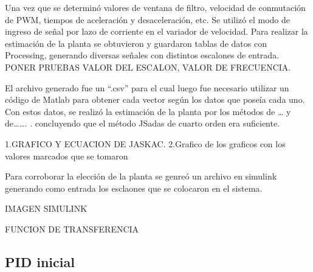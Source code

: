     Una vez que se determinó valores de ventana de filtro, velocidad de conmutación de PWM, tiempos de aceleración y desaceleración, etc. Se utilizó el modo de ingreso de señal por lazo de corriente en el variador de velocidad. Para realizar la estimación de la planta se obtuvieron y guardaron tablas de datos con Processing, generando diversas señales con distintos escalones de entrada. 
    PONER PRUEBAS VALOR DEL ESCALON, VALOR DE FRECUENCIA.
    
    El archivo generado fue un “.csv” para el cual luego fue necesario utilizar un código de Matlab para obtener cada vector según los datos que poseía cada uno. Con estos datos, se realizó la estimación de la planta por los métodos de … y de……. . concluyendo que el método JSadas de cuarto orden era suficiente.
    
    1.GRAFICO Y ECUACION DE JASKAC.
    2.Grafico de los graficos con los valores marcados que se tomaron
    
    Para corroborar la elección de la planta se genreó un archivo en simulink generando como entrada los esclaones que se colocaron en el sistema.
    
    IMAGEN SIMULINK
    
    FUNCION DE TRANSFERENCIA

    
    \subsection{PID inicial}